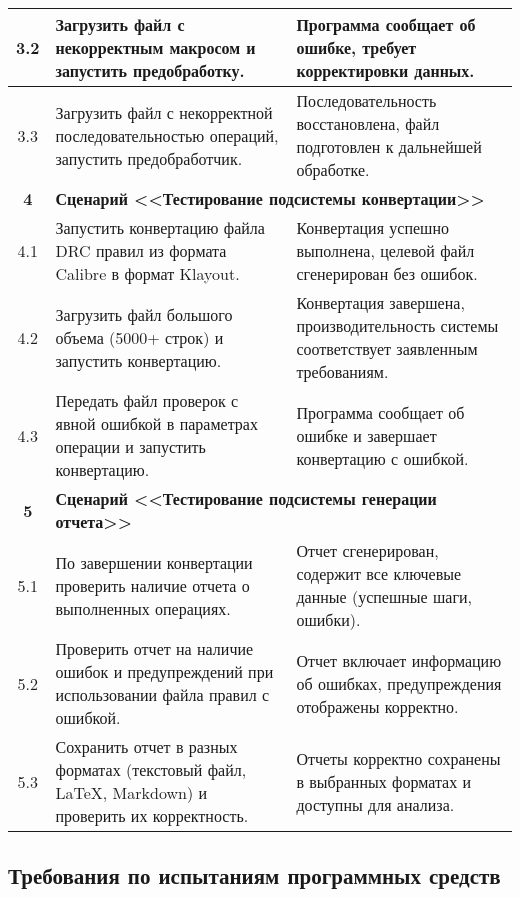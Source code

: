 \begin{longtable}{|c|p{7.5cm}|p{7.5cm}|}
	3.2
	& Загрузить файл с некорректным макросом и запустить предобработку.
	& Программа сообщает об ошибке, требует корректировки данных. \\ \hline

	3.3
	& Загрузить файл с некорректной последовательностью операций,
	запустить предобработчик.
	& Последовательность восстановлена,
	файл подготовлен к дальнейшей обработке. \\ \hline

	\textbf{4}
	& \multicolumn{2}{|l|}{\textbf{
		Сценарий <<Тестирование подсистемы конвертации>>}} \\ \hline
	4.1
	& Запустить конвертацию файла DRC правил
	из формата Calibre в формат Klayout.
	& Конвертация успешно выполнена,
	целевой файл сгенерирован без ошибок. \\ \hline

	4.2
	& Загрузить файл большого объема (5000+ строк) и запустить конвертацию.
	& Конвертация завершена,
	производительность системы соответствует заявленным требованиям. \\ \hline

	4.3
	& Передать файл проверок с явной ошибкой в параметрах операции
	и запустить конвертацию.
	& Программа сообщает об ошибке и завершает конвертацию с ошибкой. \\ \hline

	\textbf{5}
	& \multicolumn{2}{|l|}{\textbf{
		Сценарий <<Тестирование подсистемы генерации отчета>>}}  \\ \hline
	5.1
	& По завершении конвертации проверить наличие
	отчета о выполненных операциях.
	& Отчет сгенерирован,
	содержит все ключевые данные (успешные шаги, ошибки). \\ \hline

	5.2
	& Проверить отчет на наличие ошибок
	и предупреждений при использовании файла правил с ошибкой.
	& Отчет включает информацию об ошибках,
	предупреждения отображены корректно. \\ \hline

	5.3
	& Сохранить отчет в разных форматах (текстовый файл, LaTeX, Markdown)
	и проверить их корректность.
	& Отчеты корректно сохранены в выбранных форматах
	и доступны для анализа. \\ \hline
\end{longtable}

\subsection{Требования по испытаниям программных средств}


